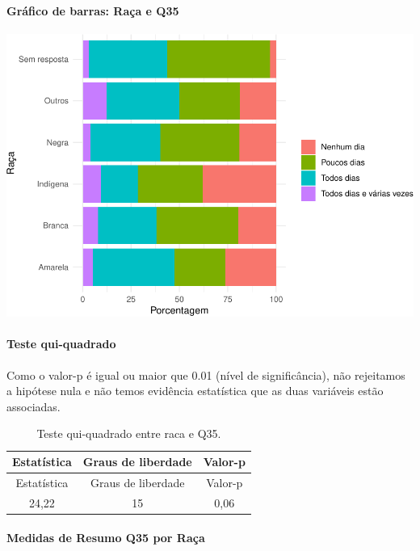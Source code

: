 \documentclass[]{article}
\let\oldparagraph\paragraph
\renewcommand{\paragraph}[1]{\oldparagraph{#1}\mbox{}}
\begin{document}
\hypertarget{gruxe1fico-de-barras-rauxe7a-e-q35}{%
\paragraph{Gráfico de barras: Raça e Q35}\label{gruxe1fico-de-barras-rauxe7a-e-q35}}

\begin{center}\includegraphics[width=0.75\linewidth]{relatorio_covid19_files/figure-latex/unnamed-chunk-1283-1} \end{center}

\hypertarget{teste-qui-quadrado-110}{%
\paragraph{Teste qui-quadrado}\label{teste-qui-quadrado-110}}

Como o valor-p é igual ou maior que 0.01 (nível de significância), não rejeitamos a hipótese nula e não temos evidência estatística que as duas variáveis estão associadas.

\begin{longtable}[]{@{}ccc@{}}
\caption{\label{tab:unnamed-chunk-1285}Teste qui-quadrado entre raca e Q35.}\tabularnewline
\toprule
Estatística & Graus de liberdade & Valor-p\tabularnewline
\midrule
\endfirsthead
\toprule
Estatística & Graus de liberdade & Valor-p\tabularnewline
\midrule
\endhead
24,22 & 15 & 0,06\tabularnewline
\bottomrule
\end{longtable}

\cleardoublepage

\hypertarget{medidas-de-resumo-q35-por-rauxe7a}{%
\paragraph{Medidas de Resumo Q35 por Raça}\label{medidas-de-resumo-q35-por-rauxe7a}}
\end{document}
